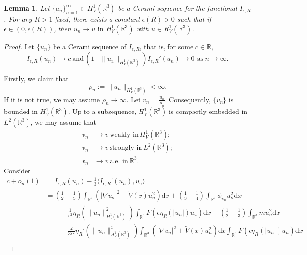 \documentclass[12pt]{amsart}
\numberwithin{equation}{section}
\newtheorem{lemma}[theorem]{Lemma}
\theoremstyle{definition}
\begin{document}
\begin{lemma}\label{lem4}
Let $\{u_n\}_{n=1}^\infty\subset H^1_V(\mathbb R^3)$ be a Cerami sequence for the functional $I_{\epsilon,R}$. For any $R>1$ fixed, there exists a constant $\epsilon(R)>0$ such that if $\epsilon\in(0,\epsilon(R))$, then $u_n\rightarrow u\text{ in }H^1_V(\mathbb R^3)$ with $u\in H^1_V(\mathbb R^3)$.
\end{lemma}
\begin{proof}
    Let $\{u_n\}$ be a Cerami sequence of $I_{\epsilon,R}$, that is, for some $c\in \mathbb{R}$,
    $$I_{\epsilon,R}(u_n)\to c~\text{and}~(1+\|u_n\|_{H^{1}_{V}(\mathbb R^3)})I_{\epsilon,R}'(u_n)\to0\ ~\text{as}~n\to\infty.$$

Firstly, we claim that
$$\rho_n:=\|u_n\|_{H^{1}_{V}(\mathbb R^3)}<\infty.$$
If it is not true, we may assume $\rho_n\to\infty$. Let $v_n=\frac{u_n}{\rho_n}$. Consequently, $\{v_n\}$ is bounded in $H^{1}_{V}(\mathbb{R}^3)$. Up to a subsequence, $H^{1}_{V}(\mathbb{R}^{3})$ is compactly embedded in $L^2(\mathbb{R}^3)$, we may assume that
\begin{equation*}
		\begin{split}
	v_n&\to v~\text{weakly in}~H^{1}_{V}(\mathbb{R}^3);\\
	v_n&\to v~\text{strongly in}~L^{2}(\mathbb{R}^3);\\
	v_n&\to v~\text{a.e. in}~ \mathbb{R}^3.
	\end{split}\end{equation*}
Consider
\begin{equation*}
		\begin{split}
		c+o_{n}(1)&=I_{\epsilon,R}(u_n)-\frac{1}{3}\langle I_{\epsilon,R}'(u_n),u_n\rangle\\
		&=\left(\frac{1}{2}-\frac{1}{3}\right)\int_{\mathbb R^3}\left(|\nabla u_n|^2+\tilde V(x)u_n^2\right)\text{d}x+\left(\frac{1}{3}-\frac{1}{4}\right)\int_{\mathbb R^3}\phi_{u_n}u_n^2\text{d}x\\
        &\quad\quad-\frac{1}{\epsilon^2}\eta _{R}\left (\|u_n\|^{2}_{H^1_{V}(\mathbb{R}^3)}\right )\int_{\mathbb{R}^{3}}F\left (\epsilon \eta _{R} \left ( \left | u_n\right |\right )u_n\right )\text{d}x-\left(\frac{1}{2}-\frac{1}{3}\right)\int_{\mathbb{R}^3}m u^{2}_n\text{d}x\\
		&\quad\quad-\frac{2}{3\epsilon^{2}}\eta _{R}'\left ( \|u_n\|^{2}_{H^1_{V}(\mathbb{R}^3)} \right )\int_{\mathbb{R}^{3}}(|\nabla u_n|^2+\tilde V(x)u_n^2) \text{d}x\int_{\mathbb{R}^{3}}F\left (\epsilon\eta _{R}\left ( \left | u_n\right | \right ) u_n\right )\text{d}x\\

\end{split}
\end{equation*}
\end{proof}
\end{document}
